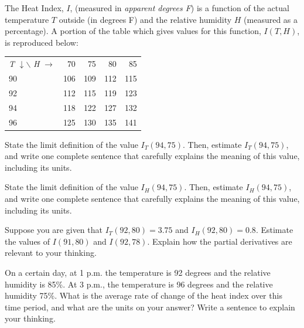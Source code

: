 \begin{exercises} 

\item \label{Ez:10.2.1}   The Heat Index, $I$, (measured in \emph{apparent degrees F}) is a function of the actual temperature $T$ outside (in degrees F) and the relative humidity $H$ (measured as a percentage).  A portion of the table which gives values for this function, $I(T,H)$, is reproduced below:
\begin{center}
\begin{tabular}{|l||r|r|r|r|} \hline
\emph{T} $\downarrow \backslash$ \emph{H} $\rightarrow$ 
	& 70 &	75 & 80 &	85  \\ \hhline{|=|=|=|=|=|}
90 & 106 & 109 & 112 & 115  \\ \hline
92 & 112 & 115 & 119 & 123  \\ \hline
94 & 118 & 122 & 127 & 132  \\ \hline
96 & 125 & 130 & 135 & 141  \\ \hline
\end{tabular}
\end{center}

				
    \ba
   	\item State the limit definition of the value $I_T(94,75)$.  Then, estimate $I_T(94,75)$, and write one complete sentence that carefully explains the meaning of this value, including its units.	
	
	\item State the limit definition of the value $I_H(94,75)$.  Then, estimate $I_H(94,75)$, and write one complete sentence that carefully explains the meaning of this value, including its units.
	
	\item Suppose you are given that $I_T(92,80) = 3.75$ and $I_H(92,80) = 0.8$.  Estimate the values of $I(91,80)$ and $I(92,78)$.  Explain how the partial derivatives are relevant to your thinking.
	
	\item On a certain day, at 1 p.m. the temperature is 92 degrees and the relative humidity is 85\%.  At 3 p.m., the temperature is 96 degrees and the relative humidity 75\%.  What is the average rate of change of the heat index over this time period, and what are the units on your answer?  Write a sentence to explain your thinking.
	
    \ea


\end{exercises}
